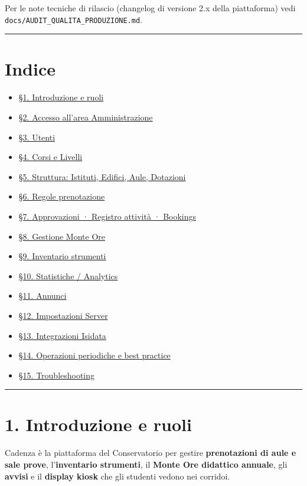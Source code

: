 \documentclass[11pt,a4paper]{article}
\begin{document}
Per le note tecniche di rilascio (changelog di versione 2.x della piattaforma) vedi \texttt{docs/AUDIT\_QUALITA\_PRODUZIONE.md}.

\medskip\hrule\medskip

\section{Indice}


\begin{itemize}
  \item \href{\#1-introduzione-e-ruoli}{§1. Introduzione e ruoli}
  \item \href{\#2-accesso-allarea-amministrazione}{§2. Accesso all'area Amministrazione}
  \item \href{\#3-utenti}{§3. Utenti}
  \item \href{\#4-corsi-e-livelli}{§4. Corsi e Livelli}
  \item \href{\#5-struttura-istituti-edifici-aule-dotazioni}{§5. Struttura: Istituti, Edifici, Aule, Dotazioni}
  \item \href{\#6-regole-prenotazione}{§6. Regole prenotazione}
  \item \href{\#7-approvazioni--registro-attivit-bookings}{§7. Approvazioni · Registro attività · Bookings}
  \item \href{\#8-gestione-monte-ore}{§8. Gestione Monte Ore}
  \item \href{\#9-inventario-strumenti}{§9. Inventario strumenti}
  \item \href{\#10-statistiche--analytics}{§10. Statistiche / Analytics}
  \item \href{\#11-annunci}{§11. Annunci}
  \item \href{\#12-impostazioni-server}{§12. Impostazioni Server}
  \item \href{\#13-integrazioni-isidata}{§13. Integrazioni Isidata}
  \item \href{\#14-operazioni-periodiche-e-best-practice}{§14. Operazioni periodiche e best practice}
  \item \href{\#15-troubleshooting}{§15. Troubleshooting}
\end{itemize}

\medskip\hrule\medskip

\section{1. Introduzione e ruoli}


Cadenza è la piattaforma del Conservatorio per gestire \textbf{prenotazioni di aule e sale prove}, l'\textbf{inventario strumenti}, il \textbf{Monte Ore didattico annuale}, gli \textbf{avvisi} e il \textbf{display kiosk} che gli studenti vedono nei corridoi.
\end{document}

